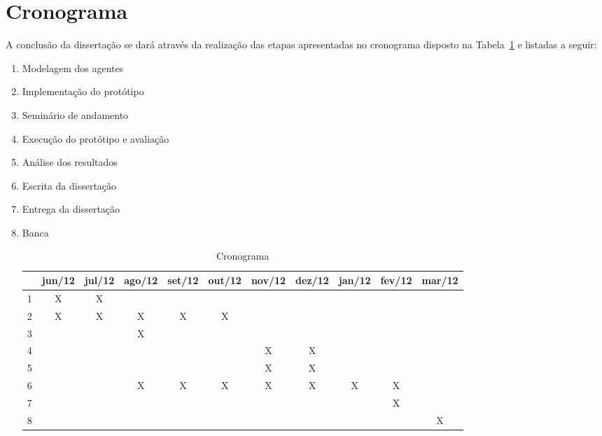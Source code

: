 
\section{Cronograma}
\label{sec:cronograma}

A conclusão da dissertação se dará através da realização das etapas apresentadas no cronograma disposto na Tabela~\ref{tab:cronograma} e listadas a seguir:

\begin{enumerate}

\item Modelagem dos agentes
\item Implementação do protótipo
\item Seminário de andamento
\item Execução do protótipo e avaliação
\item Análise dos resultados
\item Escrita da dissertação
\item Entrega da dissertação
\item Banca

\begin{table}\centering\footnotesize
  \begin{tabular*}{1\textwidth}{@{}ccccccccccc@{}}
    \toprule
    & jun/12 & jul/12 & ago/12 & set/12 & out/12 & nov/12 & dez/12 & jan/12 & fev/12 & mar/12 \\
    \midrule
    1 & X & X &   &   &   &   &   &   &   &   \\
    2 & X & X & X & X & X &   &   &   &   &   \\
    3 &   &   & X &   &   &   &   &   &   &   \\
    4 &   &   &   &   &   & X & X &   &   &   \\
    5 &   &   &   &   &   & X & X &   &   &   \\
    6 &   &   & X & X & X & X & X & X & X &   \\
    7 &   &   &   &   &   &   &   &   & X &   \\
    8 &   &   &   &   &   &   &   &   &   & X \\
    \bottomrule
  \end{tabular*}
  \caption{Cronograma}
  \label{tab:cronograma}
\end{table}

\end{enumerate}
